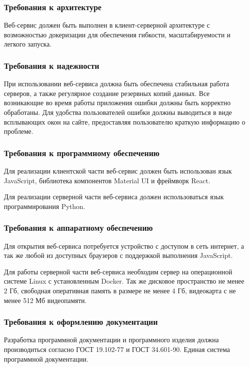 \subsubsection{Требования к архитектуре}

Веб-сервис должен быть выполнен в клиент-серверной архитектуре с возможностью докеризации для обеспечения гибкости, масштабируемости и легкого запуска.

\subsubsection{Требования к надежности}

При использовании веб-сервиса должна быть обеспечена стабильная работа серверов, а также регулярное создание резервных копий данных. Все возникающие во время работы приложения ошибки должны быть корректно обработаны. Для удобства пользователей ошибки должны выводиться в виде всплывающих окон на сайте, предоставляя пользователю краткую информацию о проблеме.

\subsubsection{Требования к программному обеспечению}

Для реализации клиентской части веб-сервис должен быть использован язык JavaScript, библиотека компонентов Material UI и фреймворк React. 

Для реализации серверной части веб-сервиса должен использоваться язык программирования Python.

\subsubsection{Требования к аппаратному обеспечению}

Для открытия веб-сервиса потребуется устройство с доступом в сеть интернет, а так же любой из доступных браузеров с поддержкой выполнения JavaScript.

Для работы серверной части веб-сервиса необходим сервер на операционной системе Linux с установленным Docker. Так же дисковое пространство не менее 2 Гб, свободная оперативная память в размере не менее 4 Гб, видеокарта с не менее 512 Мб видеопамяти.

\subsubsection{Требования к оформлению документации}

Разработка программной документации и программного изделия должна производиться согласно ГОСТ 19.102-77 и ГОСТ 34.601-90. Единая система программной документации.
